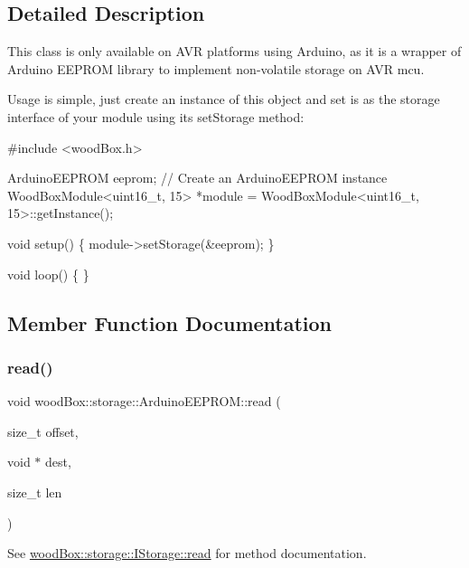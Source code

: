 \subsection{Detailed Description}
This class is only available on A\+VR platforms using Arduino, as it is a wrapper of Arduino E\+E\+P\+R\+OM library to implement non-\/volatile storage on A\+VR mcu.

Usage is simple, just create an instance of this object and set is as the storage interface of your module using its set\+Storage method\+:


\begin{DoxyCode}
\textcolor{preprocessor}{#include <woodBox.h>}

ArduinoEEPROM eeprom; \textcolor{comment}{// Create an ArduinoEEPROM instance}
WoodBoxModule<uint16\_t, 15> *module = WoodBoxModule<uint16\_t, 15>::getInstance();

\textcolor{keywordtype}{void} setup() \{
  module->setStorage(&eeprom);
\}

\textcolor{keywordtype}{void} loop() \{
\}
\end{DoxyCode}
 

\subsection{Member Function Documentation}
\mbox{\label{classwood_box_1_1storage_1_1_arduino_e_e_p_r_o_m_a1b9deb25ea803456b5450f4e3782fd20}} 
\subsubsection{\texorpdfstring{read()}{read()}}
{\footnotesize\ttfamily void wood\+Box\+::storage\+::\+Arduino\+E\+E\+P\+R\+O\+M\+::read (\begin{DoxyParamCaption}\item[{size\+\_\+t}]{offset,  }\item[{void $\ast$}]{dest,  }\item[{size\+\_\+t}]{len }\end{DoxyParamCaption})\hspace{0.3cm}{\ttfamily [virtual]}}

See \mbox{\hyperlink{classwood_box_1_1storage_1_1_i_storage_a01bab924be0844e3866b27279caa506d}{wood\+Box\+::storage\+::\+I\+Storage\+::read}} for method documentation. 

